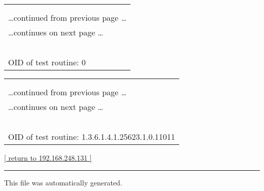 \documentclass{article}
\begin{document}
\begin{longtable}{|p{}|}
\hline
\rowcolor{openvas_log}{\color{white}{Log}}\\
\rowcolor{openvas_log}{\color{white}{NVT: }}\\
\hline
\endfirsthead
\hfill\ldots continued from previous page \ldots \\
\hline
\endhead
\hline
\ldots continues on next page \ldots \\
\endfoot
\hline
\endlastfoot
\\
\rowcolor{white}{\verb=Open port.=}\\
\rowcolor{white}{\verb==}\\
\rowcolor{white}{\verb==}\\
\\
OID of test routine: 0\\
\end{longtable}

\begin{longtable}{|p{}|}
\hline
\rowcolor{openvas_log}{\color{white}{Log (CVSS: 0.0) }}\\
\rowcolor{openvas_log}{\color{white}{NVT: SMB on port 445}}\\
\hline
\endfirsthead
\hfill\ldots continued from previous page \ldots \\
\hline
\endhead
\hline
\ldots continues on next page \ldots \\
\endfoot
\hline
\endlastfoot
\\
\rowcolor{white}{\verb=An SMB server is running on this port=}\\
\rowcolor{white}{\verb==}\\
\rowcolor{white}{\verb==}\\
\\
OID of test routine: 1.3.6.1.4.1.25623.1.0.11011\\
\end{longtable}

\begin{footnotesize}\hyperref[host:192.168.248.131]{[ return to 192.168.248.131 ]}\end{footnotesize}

\begin{center}
\medskip
\rule{\textwidth}{0.1pt}

This file was automatically generated.
\end{center}
\end{document}
